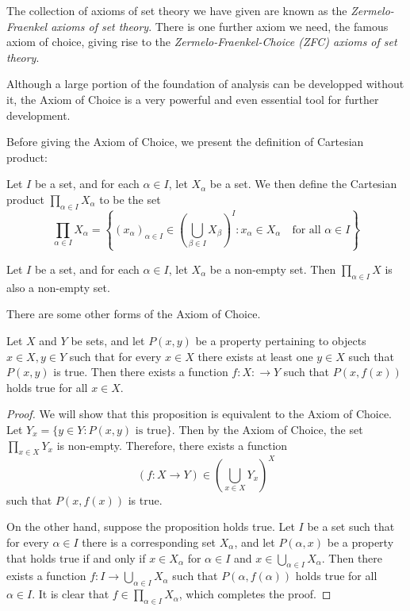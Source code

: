 The collection of axioms of set theory we have given are known as the 
\emph{Zermelo-Fraenkel axioms of set theory}. 
There is one further axiom we need, the famous axiom of choice, giving rise 
to the \emph{Zermelo-Fraenkel-Choice (ZFC) axioms of set theory}. 

Although a large portion of the foundation of analysis can be developped 
without it, the Axiom of Choice is a very powerful and even essential tool 
for further development. 

Before giving the Axiom of Choice, we present the definition of Cartesian 
product:
\begin{defn}
Let $I$ be a set, and for each $\alpha \in I$, let $X_\alpha$ be a set. 
We then define the Cartesian product $\prod_{\alpha \in I} X_\alpha$ to be 
the set 
\begin{equation*}
    \prod_{\alpha \in I} X_\alpha 
    = \left\{ (x_\alpha)_{\alpha \in I} \in 
        \left( \bigcup_{\beta \in I}X_\beta \right)^I: 
        x_\alpha \in X_\alpha \quad \text{for all } \alpha \in I 
        \right\}
\end{equation*}
\end{defn}

\begin{axiom}[Choice]
Let $I$ be a set, and for each $\alpha \in I$, let $X_\alpha$ be a non-empty 
set. 
Then $\prod_{\alpha \in I} X$ is also a non-empty set. 
\end{axiom}

There are some other forms of the Axiom of Choice. 
\begin{prop}
Let $X$ and $Y$ be sets, and let $P(x, y)$ be a property pertaining to 
objects $x \in X, y \in Y$ such that for every $x \in X$ there exists at 
least one $y \in X$ such that $P(x, y)$ is true. 
Then there exists a function $f: X: \to Y$ such that $P(x, f(x))$ holds 
true for all $x \in X$. 
\end{prop}
\begin{proof}
We will show that this proposition is equivalent to the Axiom of Choice. 
Let $Y_x = \{y \in Y: P(x, y) \text{ is true}\}$. 
Then by the Axiom of Choice, the set $\prod_{x \in X} Y_x$ is non-empty. 
Therefore, there exists a function 
\begin{equation*}
    (f: X \to Y) \in \left( \bigcup_{x \in X} Y_x \right)^X
\end{equation*}
such that $P(x, f(x))$ is true.  

On the other hand, suppose the proposition holds true. 
Let $I$ be a set such that for every $\alpha \in I$ there is a corresponding 
set $X_\alpha$, and let $P(\alpha, x)$ be a property that holds true if and 
only if $x \in X_\alpha$ for $\alpha \in I$ and $x \in \bigcup_
{\alpha \in I} X_\alpha$. 
Then there exists a function $f: I \to \bigcup_{\alpha \in I} X_\alpha$ such 
that $P(\alpha, f(\alpha))$ holds true for all $\alpha \in I$. 
It is clear that $f \in \prod_{\alpha \in I} X_\alpha$, which completes the 
proof. 
\end{proof}

